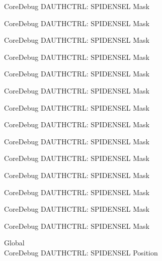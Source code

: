 \begin{DoxyRefList}
\label{deprecated__deprecated000222}%
%
Core\+Debug DAUTHCTRL\+: SPIDENSEL Mask 

\label{deprecated__deprecated000285}%
%
Core\+Debug DAUTHCTRL\+: SPIDENSEL Mask 

\label{deprecated__deprecated000364}%
%
Core\+Debug DAUTHCTRL\+: SPIDENSEL Mask 

\label{deprecated__deprecated000440}%
%
Core\+Debug DAUTHCTRL\+: SPIDENSEL Mask 

\label{deprecated__deprecated000543}%
%
Core\+Debug DAUTHCTRL\+: SPIDENSEL Mask 

\label{deprecated__deprecated000645}%
%
Core\+Debug DAUTHCTRL\+: SPIDENSEL Mask 

\label{deprecated__deprecated000770}%
%
Core\+Debug DAUTHCTRL\+: SPIDENSEL Mask 

\label{deprecated__deprecated000824}%
%
Core\+Debug DAUTHCTRL\+: SPIDENSEL Mask 

\label{deprecated__deprecated000900}%
%
Core\+Debug DAUTHCTRL\+: SPIDENSEL Mask 

\label{deprecated__deprecated000963}%
%
Core\+Debug DAUTHCTRL\+: SPIDENSEL Mask 

\label{deprecated__deprecated001042}%
%
Core\+Debug DAUTHCTRL\+: SPIDENSEL Mask 

\label{deprecated__deprecated001118}%
%
Core\+Debug DAUTHCTRL\+: SPIDENSEL Mask 

\label{deprecated__deprecated001221}%
%
Core\+Debug DAUTHCTRL\+: SPIDENSEL Mask 

\label{deprecated__deprecated001323}%
%
Core\+Debug DAUTHCTRL\+: SPIDENSEL Mask  
\item[Global \doxylink{group___c_m_s_i_s___s_c_b_ga587610b7ac18292de47bf9d675b0b88c}{Core\+Debug\+\_\+\+DAUTHCTRL\+\_\+\+SPIDENSEL\+\_\+\+Pos} ]\hfill \\
\label{deprecated__deprecated000091}%
%
Core\+Debug DAUTHCTRL\+: SPIDENSEL Position 


\end{DoxyRefList}
